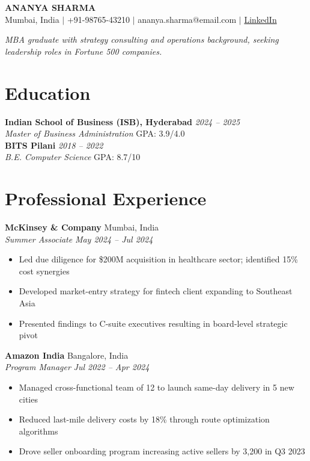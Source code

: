 \documentclass[11pt,letterpaper]{article}
\begin{document}
\begin{center}
{\LARGE\bfseries\scshape ANANYA SHARMA}\\[6pt]
{\small Mumbai, India \quad $\vert$ \quad +91-98765-43210 \quad $\vert$ \quad ananya.sharma@email.com \quad $\vert$ \quad \href{https://linkedin.com/in/ananyasharma}{LinkedIn}}
\end{center}

\vspace{4pt}
\begin{center}
\textit{\color{navy}MBA graduate with strategy consulting and operations background, seeking leadership roles in Fortune 500 companies.}
\end{center}

\section{Education}
\textbf{Indian School of Business (ISB), Hyderabad} \hfill \textit{2024 -- 2025}\\
\textit{Master of Business Administration} \hfill GPA: 3.9/4.0\\[2pt]
\textbf{BITS Pilani} \hfill \textit{2018 -- 2022}\\
\textit{B.E. Computer Science} \hfill GPA: 8.7/10

\section{Professional Experience}
\textbf{McKinsey \& Company} \hfill Mumbai, India\\
\textit{Summer Associate} \hfill \textit{May 2024 -- Jul 2024}
\begin{itemize}
\item Led due diligence for \$200M acquisition in healthcare sector; identified 15\% cost synergies
\item Developed market-entry strategy for fintech client expanding to Southeast Asia
\item Presented findings to C-suite executives resulting in board-level strategic pivot
\end{itemize}

\textbf{Amazon India} \hfill Bangalore, India\\
\textit{Program Manager} \hfill \textit{Jul 2022 -- Apr 2024}
\begin{itemize}
\item Managed cross-functional team of 12 to launch same-day delivery in 5 new cities
\item Reduced last-mile delivery costs by 18\% through route optimization algorithms
\item Drove seller onboarding program increasing active sellers by 3,200 in Q3 2023
\end{itemize}
\end{document}
